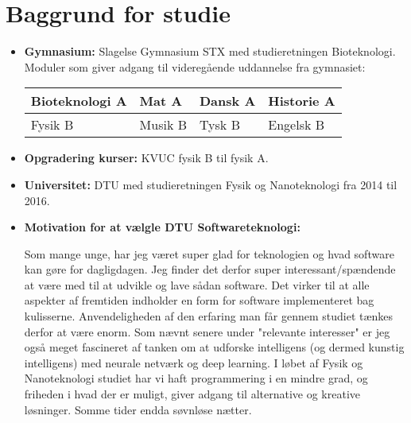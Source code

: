 \section{Baggrund for studie}


\begin{itemize}
  \item \textbf{Gymnasium:}
  Slagelse Gymnasium STX med studieretningen Bioteknologi.\\
  
  Moduler som giver adgang til videregående uddannelse fra gymnasiet:
  

\begin{table}[H]
    \centering
    \begin{tabular}{|l|l|l|l|}
    \hline
    Bioteknologi A  & Mat A     & Dansk A   & Historie A \\ \hline
    Fysik B         & Musik B   & Tysk B    & Engelsk B  \\ \hline
    \end{tabular}
\end{table}

  \item \textbf{Opgradering kurser:}  KVUC fysik B til fysik A.

  \item \textbf{Universitet:} DTU med studieretningen Fysik og Nanoteknologi fra 2014 til 2016.
  
  \item \textbf{Motivation for at vælgle DTU Softwareteknologi: }
  
  Som mange unge, har jeg været super glad for teknologien og hvad software kan gøre for dagligdagen. Jeg finder det derfor super interessant/spændende at være med til at udvikle og lave sådan software. Det virker til at alle aspekter af fremtiden indholder en form for software implementeret bag kulisserne. Anvendeligheden af den erfaring man får gennem studiet tænkes derfor at være enorm. Som nævnt senere under "relevante interesser" er jeg også meget fascineret af tanken om at udforske intelligens (og dermed kunstig intelligens) med neurale netværk og deep learning. I løbet af Fysik og Nanoteknologi studiet har vi haft programmering i en mindre grad, og friheden i hvad der er muligt, giver adgang til alternative og kreative løsninger. Somme tider endda søvnløse nætter.

\end{itemize}